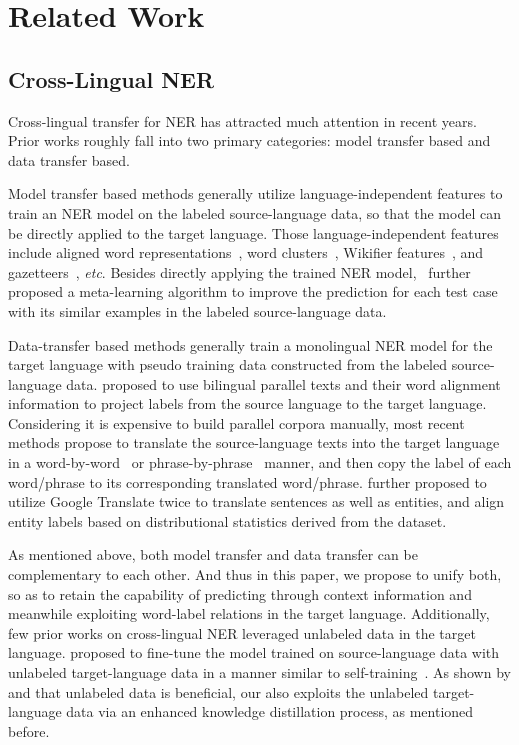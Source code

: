 \documentclass{article}
\newcommand\etc{\textit{etc}}
\newcommand\unitrans{\text{UniTrans}}
\begin{document}
\section{Related Work}
\subsection{Cross-Lingual NER}
Cross-lingual transfer for NER has attracted much attention in recent years. 
Prior works roughly fall into two primary categories: model transfer based and data transfer based.

Model transfer based methods generally utilize language-independent features to train an NER model on the labeled source-language data, so that the model can be directly applied to the target language. 
Those language-independent features include aligned word representations~\cite{ni2017weakly,wu2019beto}, word clusters~\cite{tackstrom2012}, Wikifier features~\cite{tsai2016cross}, and gazetteers~\cite{zirikly2015cross}, \etc. 
Besides directly applying the trained NER model,~\cite{wu2020enhanced} further proposed a meta-learning algorithm to improve the prediction for each test case with its similar examples in the labeled source-language data.

Data-transfer based methods generally train a monolingual NER model for the target language with pseudo training data constructed from the labeled source-language data. 
\cite{ni2017weakly} proposed to use bilingual parallel texts and their word alignment information to project labels from the source language to the target language. 
Considering it is expensive to build parallel corpora manually, most recent methods propose to translate the source-language texts into the target language in a word-by-word~\cite{xie2018neural} or phrase-by-phrase~\cite{mayhew2017cheap} manner, and then copy the label of each word/phrase to its corresponding translated word/phrase.
\cite{jain2019entity} further proposed to utilize Google Translate twice to translate sentences as well as entities, and align entity labels based on distributional statistics derived from the dataset.

As mentioned above, both model transfer and data transfer can be complementary to each other. 
And thus in this paper, we propose \unitrans{} to unify both, so as to retain the capability of predicting through context information and meanwhile exploiting word-label relations in the target language. 
Additionally, few prior works on cross-lingual NER leveraged unlabeled data in the target language. 
\cite{bari2019zero} proposed to fine-tune the model trained on source-language data with unlabeled target-language data in a manner similar to self-training~\cite{scudder1965probability}. 
As shown by \cite{he2017aunified} and \cite{bari2019zero} that unlabeled data is beneficial, our \unitrans{} also exploits the unlabeled target-language data via an enhanced knowledge distillation process, as mentioned before. 
\end{document}

